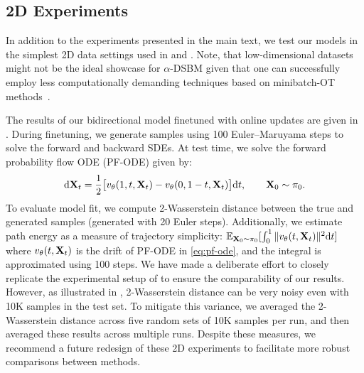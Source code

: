 \documentclass{article}
\begin{document}
\subsection{2D Experiments}

In addition to the experiments presented in the main text, we test our models in the simplest 2D data settings used in \citet{tong_conditional_2023} and \citet{shi2023DSBM}. Note, that low-dimensional datasets might not be the ideal showcase for $\alpha$-DSBM given that one can successfully employ less computationally demanding techniques based on minibatch-OT methods~\citep{tong2024simulationfree}. 

The results of our bidirectional model finetuned with online updates are given in . During finetuning, we generate samples using 100 Euler–Maruyama steps to solve the forward and backward SDEs.
At test time, we solve the forward probability flow ODE (PF-ODE) given by:
\begin{equation}
\label{eq:pf-ode}
    \rmd\bfX_t = \frac{1}{2} \big[ v_\theta(1, t, \bfX_t) - v_\theta(0, 1 - t, \bfX_t) \big] \rmd t, \qquad \bfX_0 \sim \pi_0. 
\end{equation}
To evaluate model fit, we compute 2-Wasserstein distance between the true and generated samples (generated with 20 Euler steps). Additionally, we estimate path energy as a measure of trajectory simplicity: $\mathbb{E}_{\mathbf{X}_0\sim \pi_0}[\int_0^1 \| v_\theta(t, \mathbf{X}_t)\|^2 \mathrm{d} t]$ where $v_\theta(t, \mathbf{X}_t)$ is the drift of PF-ODE in \eqref{eq:pf-ode}, and the integral is approximated using 100 steps.
We have made a deliberate effort to closely replicate the experimental setup of \citet{shi2023DSBM} to ensure the comparability of our results. However, as illustrated in , 2-Wasserstein distance can be very noisy even with 10K samples in the test set. To mitigate this variance, we averaged the 2-Wasserstein distance across five random sets of 10K samples per run, and then averaged these results across multiple runs.  Despite these measures, we recommend a future redesign of these 2D experiments to facilitate more robust comparisons between methods.       
\end{document}
